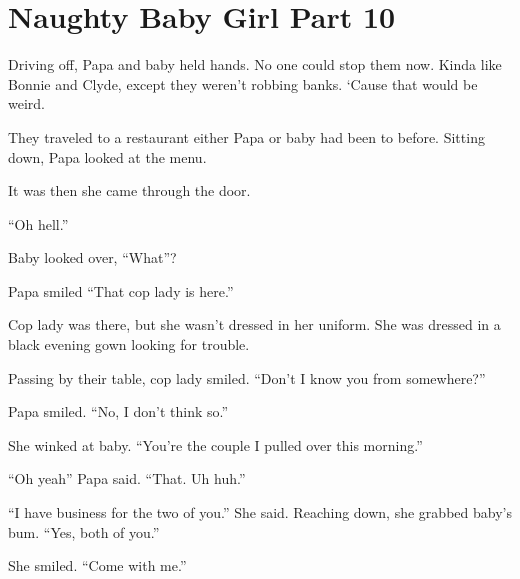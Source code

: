 \section{Naughty Baby Girl Part 10}

     Driving off, Papa and baby held hands. No one could stop them now. Kinda like Bonnie and Clyde, except they weren’t robbing banks. ‘Cause that would be weird.

    They traveled to a restaurant either Papa or baby had been to before. Sitting down, Papa looked at the menu.

    It was then she came through the door.

    “Oh hell.”

    Baby looked over, “What”?

    Papa smiled “That cop lady is here.”

    Cop lady was there, but she wasn’t dressed in her uniform. She was dressed in a black evening gown looking for trouble.

    Passing by their table, cop lady smiled. “Don’t I know you from somewhere?”

    Papa smiled. “No, I don’t think so.”

    She winked at baby. “You’re the couple I pulled over this morning.”

    “Oh yeah” Papa said. “That. Uh huh.”

    “I have business for the two of you.” She said. Reaching down, she grabbed baby’s bum. “Yes, both of you.”

    She smiled. “Come with me.”

